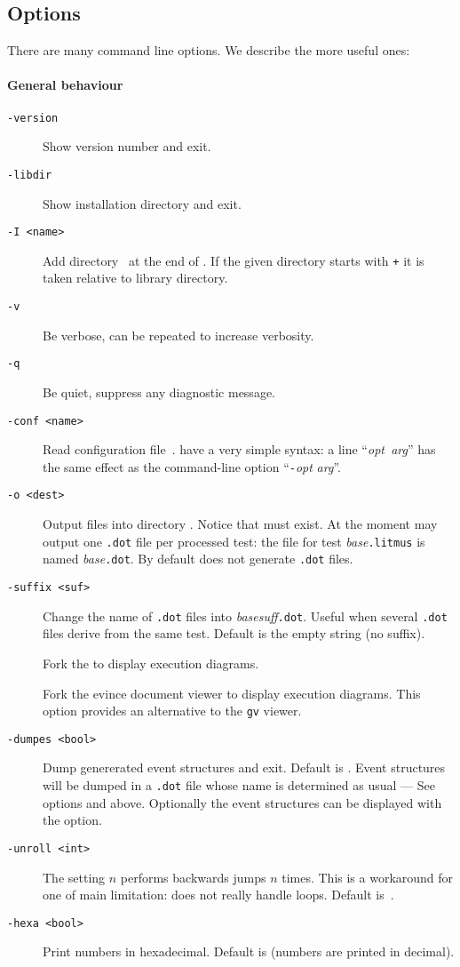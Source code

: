 \subsection{Options}
There are many command line options.
We describe the more useful ones:

\paragraph*{General behaviour}
\begin{description}
\item[{\tt -version}] Show version number and exit.
\item[{\tt -libdir}] Show installation directory and exit.
\item[{\tt -I <name>}] Add directory~ at the end of
 . If the given directory
starts with \texttt{+} it is taken relative to \herd{} library directory.
\item[{\tt -v}] Be verbose, can be repeated to increase verbosity.
\item[{\tt -q}] Be quiet, suppress any diagnostic message.
\item[{\tt -conf <name>}] Read configuration file~.
 have a very simple syntax:
a line ``\textit{opt}\texttt{  }\textit{arg}'' has the same effect as
the command-line option ``\texttt{-}\textit{opt} \textit{arg}''.
\item[{\tt -o <dest>}] Output files into directory .
Notice that  must exist.
At the moment \herd{} may output one \texttt{.dot} file per processed test:
the file for test \textit{base}\texttt{.litmus}
is named  \textit{base}\texttt{.dot}.
By default \herd{} does not generate \texttt{.dot} files.
\item[{\tt -suffix <suf>}] Change the name of \texttt{.dot} files
into \textit{base}\textit{suff}\texttt{.dot}. Useful when several \texttt{.dot} files derive from the same test. Default is the empty string (no suffix).
\item[{\tt {}}] Fork the  to display execution diagrams.
\item[{\tt {}}] Fork the evince document viewer to display execution diagrams. This option provides an alternative to the
{\tt gv} viewer.
\item[{\tt -dumpes <bool>}]
Dump genererated event structures and exit. Default is .
Event structures will be dumped in a \texttt{.dot} file whose
name is determined as usual --- See options  and  above.
Optionally the event structures can be displayed with the  option.
\item[{\tt -unroll <int>}] The setting $n$ performs backwards
jumps $n$ times. This is a workaround for one of \herd{} main limitation:
\herd{} does not really handle loops. Default is~.
\item[{\tt -hexa <bool>}] Print numbers in hexadecimal. Default is 
(numbers are printed in decimal).
\end{description}

